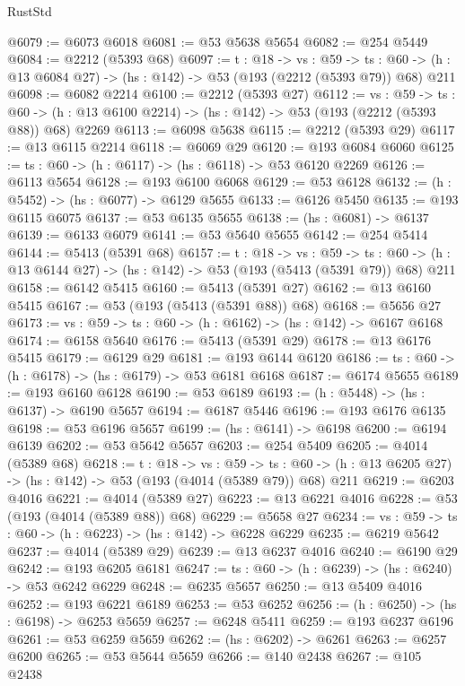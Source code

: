 \begin{lexlean}{RustStd}
\begin{coremodule}
@6079 := @6073 @6018
@6081 := @53 @5638 @5654
@6082 := @254 @5449
@6084 := @2212 (@5393 @68)
@6097 := {t : @18} ->
  {vs : @59} ->
  {ts : @60} -> (h : @13 @6084 @27) -> (hs : @142) -> @53 (@193 (@2212 (@5393 @79)) @68) @211
@6098 := @6082 @2214
@6100 := @2212 (@5393 @27)
@6112 := {vs : @59} ->
  {ts : @60} -> (h : @13 @6100 @2214) -> (hs : @142) -> @53 (@193 (@2212 (@5393 @88)) @68) @2269
@6113 := @6098 @5638
@6115 := @2212 (@5393 @29)
@6117 := @13 @6115 @2214
@6118 := @6069 @29
@6120 := @193 @6084 @6060
@6125 := {ts : @60} -> (h : @6117) -> (hs : @6118) -> @53 @6120 @2269
@6126 := @6113 @5654
@6128 := @193 @6100 @6068
@6129 := @53 @6128
@6132 := (h : @5452) -> (hs : @6077) -> @6129 @5655
@6133 := @6126 @5450
@6135 := @193 @6115 @6075
@6137 := @53 @6135 @5655
@6138 := (hs : @6081) -> @6137
@6139 := @6133 @6079
@6141 := @53 @5640 @5655
@6142 := @254 @5414
@6144 := @5413 (@5391 @68)
@6157 := {t : @18} ->
  {vs : @59} ->
  {ts : @60} -> (h : @13 @6144 @27) -> (hs : @142) -> @53 (@193 (@5413 (@5391 @79)) @68) @211
@6158 := @6142 @5415
@6160 := @5413 (@5391 @27)
@6162 := @13 @6160 @5415
@6167 := @53 (@193 (@5413 (@5391 @88)) @68)
@6168 := @5656 @27
@6173 := {vs : @59} -> {ts : @60} -> (h : @6162) -> (hs : @142) -> @6167 @6168
@6174 := @6158 @5640
@6176 := @5413 (@5391 @29)
@6178 := @13 @6176 @5415
@6179 := @6129 @29
@6181 := @193 @6144 @6120
@6186 := {ts : @60} -> (h : @6178) -> (hs : @6179) -> @53 @6181 @6168
@6187 := @6174 @5655
@6189 := @193 @6160 @6128
@6190 := @53 @6189
@6193 := (h : @5448) -> (hs : @6137) -> @6190 @5657
@6194 := @6187 @5446
@6196 := @193 @6176 @6135
@6198 := @53 @6196 @5657
@6199 := (hs : @6141) -> @6198
@6200 := @6194 @6139
@6202 := @53 @5642 @5657
@6203 := @254 @5409
@6205 := @4014 (@5389 @68)
@6218 := {t : @18} ->
  {vs : @59} ->
  {ts : @60} -> (h : @13 @6205 @27) -> (hs : @142) -> @53 (@193 (@4014 (@5389 @79)) @68) @211
@6219 := @6203 @4016
@6221 := @4014 (@5389 @27)
@6223 := @13 @6221 @4016
@6228 := @53 (@193 (@4014 (@5389 @88)) @68)
@6229 := @5658 @27
@6234 := {vs : @59} -> {ts : @60} -> (h : @6223) -> (hs : @142) -> @6228 @6229
@6235 := @6219 @5642
@6237 := @4014 (@5389 @29)
@6239 := @13 @6237 @4016
@6240 := @6190 @29
@6242 := @193 @6205 @6181
@6247 := {ts : @60} -> (h : @6239) -> (hs : @6240) -> @53 @6242 @6229
@6248 := @6235 @5657
@6250 := @13 @5409 @4016
@6252 := @193 @6221 @6189
@6253 := @53 @6252
@6256 := (h : @6250) -> (hs : @6198) -> @6253 @5659
@6257 := @6248 @5411
@6259 := @193 @6237 @6196
@6261 := @53 @6259 @5659
@6262 := (hs : @6202) -> @6261
@6263 := @6257 @6200
@6265 := @53 @5644 @5659
@6266 := @140 @2438
@6267 := @105 @2438

\end{coremodule}
\end{lexlean}
